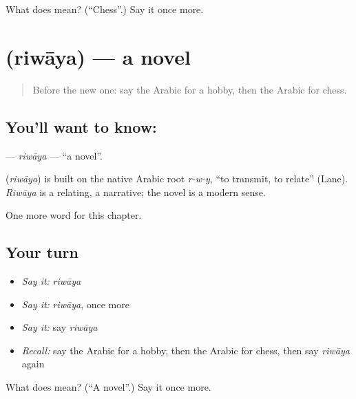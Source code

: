 \begin{tcolorbox}[breakable,colback=teal!4,colframe=teal!35!black,title={Before you move on}]
What does  mean? (\textquotedblleft{}Chess\textquotedblright{}.) Say it once more.
\end{tcolorbox}
\section[\texorpdfstring{\ar{رواية} (riwāya)}{رواية (riwāya)}]{ (riwāya) — a novel}

\label{lesson:AR-C186-riwaya}



\begin{quote}
Before the new one: say the Arabic for a hobby, then the Arabic for chess.
\end{quote}

\subsection*{You'll want to know: }
\textbf{} — \emph{riwāya} — \textquotedblleft{}a novel\textquotedblright{}.

\begin{cousinweb}
\textbf{} (\emph{riwāya}) is built on the native Arabic root \emph{r-w-y}, \textquotedblleft{}to transmit, to relate\textquotedblright{} (Lane). \emph{Riwāya} is a relating, a narrative; the novel is a modern sense.
\end{cousinweb}

\begin{grammarlens}[title={What you've built}]
One more word for this chapter.
\end{grammarlens}

\subsection*{Your turn}
\begin{itemize}
\raggedright
  \item \emph{Say it:} \emph{riwāya}
  \item \emph{Say it:} \emph{riwāya}, once more
  \item \emph{Say it:} say \emph{riwāya}
  \item \emph{Recall:} say the Arabic for a hobby, then the Arabic for chess, then say \emph{riwāya} again
\end{itemize}

\begin{tcolorbox}[breakable,colback=teal!4,colframe=teal!35!black,title={Before you move on}]
What does  mean? (\textquotedblleft{}A novel\textquotedblright{}.) Say it once more.
\end{tcolorbox}
